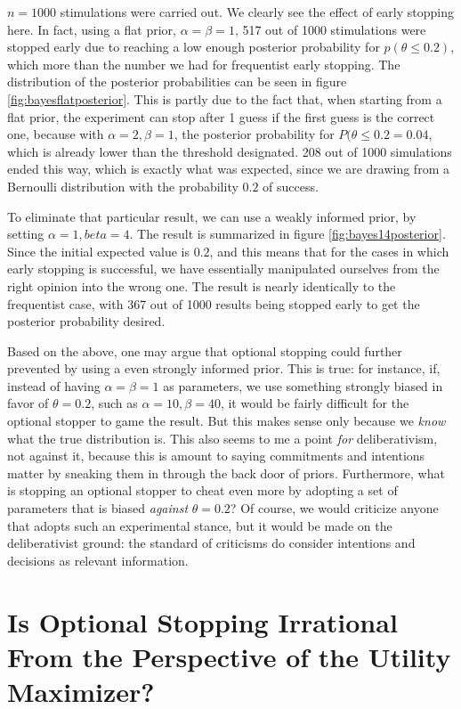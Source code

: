 $n=1000$ stimulations were carried out. We clearly see the effect of early stopping here. In fact, using a flat prior, $\alpha=\beta=1$, 517 out of 1000 stimulations were stopped early due to reaching a low enough posterior probability for $p(\theta \leq 0.2)$, which more than the number we had for frequentist early stopping. The distribution of the posterior probabilities can be seen in figure \ref{fig:bayesflatposterior}. This is partly due to the fact that, when starting from a flat prior, the  experiment can stop after 1 guess if the first guess is the correct one, because with $\alpha = 2, \beta=1$, the posterior probability for $P(\theta\leq 0.2 = 0.04$, which is already lower than the threshold designated. 208 out of 1000 simulations ended this way, which is exactly what was expected, since we are drawing from a Bernoulli distribution with the probability $0.2$ of success. 

To eliminate that particular result, we can use a weakly informed prior, by setting $\alpha = 1, beta=4$. The result is summarized in figure \ref{fig:bayes14posterior}. Since the initial expected value is $0.2$, and this means that for the cases in which early stopping is successful, we have essentially manipulated ourselves from the right opinion into the wrong one. The result is nearly identically to the frequentist case, with 367 out of 1000 results being stopped early to get the posterior probability desired.


Based on the above, one may argue that optional stopping could further prevented by using a even strongly informed prior. This is true: for instance, if, instead of
having \(\alpha = \beta = 1\) as parameters, we use something strongly
biased in favor of \(\theta = 0.2\), such as
\(\alpha = 10, \beta = 40\), it would be fairly difficult for the
optional stopper to game the result. But this makes sense only because we \emph{know} what the true distribution is. This also seems to me a point
\emph{for} deliberativism, not against it, because this is amount to
saying commitments and intentions matter by sneaking them in through the
back door of priors. Furthermore, what is stopping an optional stopper
to cheat even more by adopting a set of parameters that is biased
\emph{against} \(\theta = 0.2\)? Of course, we would criticize anyone
that adopts such an experimental stance, but it would be made on the
deliberativist ground: the standard of criticisms do consider intentions and decisions as relevant information.

\hypertarget{is-optional-stopping-irrational-from-the-perspective-of-the-utility-maximizer}{%
\section{Is Optional Stopping Irrational From the Perspective of the
Utility
Maximizer?}\label{is-optional-stopping-irrational-from-the-perspective-of-the-utility-maximizer}}

